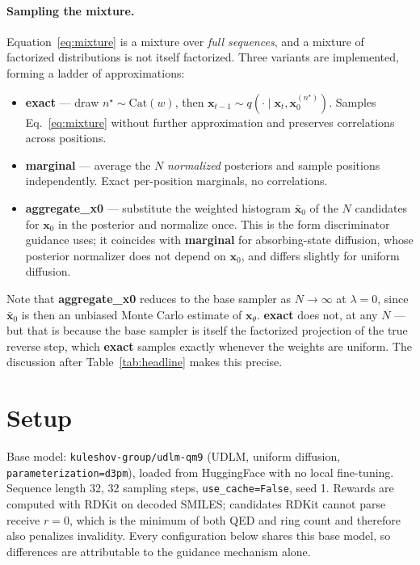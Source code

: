 \documentclass[11pt]{article}
\begin{document}
\paragraph{Sampling the mixture.}
Equation~\eqref{eq:mixture} is a mixture over \emph{full sequences}, and a
mixture of factorized distributions is not itself factorized. Three variants
are implemented, forming a ladder of approximations:
\begin{itemize}
  \item \textbf{exact} --- draw $n^\star \sim \mathrm{Cat}(w)$, then
        $\mathbf{x}_{t-1} \sim q(\cdot \mid \mathbf{x}_t, \mathbf{x}_0^{(n^\star)})$.
        Samples Eq.~\eqref{eq:mixture} without further approximation and
        preserves correlations across positions.
  \item \textbf{marginal} --- average the $N$ \emph{normalized} posteriors and
        sample positions independently. Exact per-position marginals, no
        correlations.
  \item \textbf{aggregate\_x0} --- substitute the weighted histogram
        $\bar{\mathbf{x}}_0$ of the $N$ candidates for $\mathbf{x}_0$ in the
        posterior and normalize once. This is the form discriminator guidance
        uses; it coincides with \textbf{marginal} for absorbing-state diffusion,
        whose posterior normalizer does not depend on $\mathbf{x}_0$, and
        differs slightly for uniform diffusion.
\end{itemize}
Note that \textbf{aggregate\_x0} reduces to the base sampler as $N \to \infty$
at $\lambda = 0$, since $\bar{\mathbf{x}}_0$ is then an unbiased Monte Carlo
estimate of $\mathbf{x}_\theta$. \textbf{exact} does not, at any $N$ --- but
that is because the base sampler is itself the factorized projection of the true
reverse step, which \textbf{exact} samples exactly whenever the weights are
uniform. The discussion after Table~\ref{tab:headline} makes this precise.

\section{Setup}

Base model: \texttt{kuleshov-group/udlm-qm9} (UDLM, uniform diffusion,
\texttt{parameterization=d3pm}), loaded from HuggingFace with no local
fine-tuning. Sequence length 32, 32 sampling steps, \texttt{use\_cache=False},
seed 1. Rewards are computed with RDKit on decoded SMILES; candidates RDKit
cannot parse receive $r = 0$, which is the minimum of both QED and ring count
and therefore also penalizes invalidity. Every configuration below shares this
base model, so differences are attributable to the guidance mechanism alone.
\end{document}
